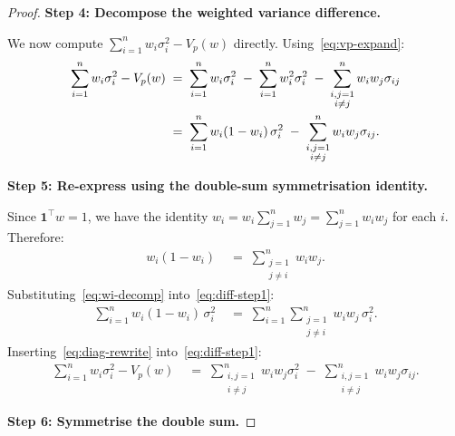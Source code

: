 \documentclass[12pt,openany]{book}
\newcommand{\bfw}{\mathbf{w}}
\newcommand{\bfone}{\mathbf{1}}
\numberwithin{equation}{chapter}
\theoremstyle{plain}
\theoremstyle{definition}
\theoremstyle{remark}
\def\bfw{w}%
\begin{document}
\begin{proof}
\medskip
\noindent\textbf{Step 4: Decompose the weighted variance difference.}

\medskip
\noindent We now compute $\sum_{i=1}^n w_i \sigma_i^2 - V_p(\bfw)$
directly.  Using~\eqref{eq:vp-expand}:
\begin{align}
  \sum_{i=1}^n w_i \sigma_i^2 - V_p(\bfw)
  &\;=\; \sum_{i=1}^n w_i \sigma_i^2
         \;-\; \sum_{i=1}^n w_i^2 \sigma_i^2
         \;-\; \sum_{\substack{i,j=1\\i \neq j}}^n w_i w_j \sigma_{ij}
  \notag\\
  &\;=\; \sum_{i=1}^n w_i(1 - w_i)\, \sigma_i^2
         \;-\; \sum_{\substack{i,j=1\\i \neq j}}^n w_i w_j \sigma_{ij}.
  \label{eq:diff-step1}
\end{align}

\medskip
\noindent\textbf{Step 5: Re-express using the double-sum symmetrisation identity.}

\medskip
\noindent Since $\bfone^\top\bfw = 1$, we have the identity
$w_i = w_i \sum_{j=1}^n w_j = \sum_{j=1}^n w_i w_j$ for each $i$.
Therefore:
\begin{align}
  w_i(1 - w_i)
  &\;=\; \sum_{\substack{j=1\\j \neq i}}^n w_i w_j.
  \label{eq:wi-decomp}
\end{align}
Substituting~\eqref{eq:wi-decomp} into~\eqref{eq:diff-step1}:
\begin{align}
  \sum_{i=1}^n w_i(1 - w_i)\, \sigma_i^2
  &\;=\; \sum_{i=1}^n \sum_{\substack{j=1\\j\neq i}}^n
         w_i w_j\, \sigma_i^2.
  \label{eq:diag-rewrite}
\end{align}
Inserting~\eqref{eq:diag-rewrite} into~\eqref{eq:diff-step1}:
\begin{align}
  \sum_{i=1}^n w_i \sigma_i^2 - V_p(\bfw)
  &\;=\; \sum_{\substack{i,j=1\\i\neq j}}^n w_i w_j \sigma_i^2
         \;-\; \sum_{\substack{i,j=1\\i\neq j}}^n w_i w_j \sigma_{ij}.
  \label{eq:diff-step2}
\end{align}

\medskip
\noindent\textbf{Step 6: Symmetrise the double sum.}


\end{proof}
\end{document}
